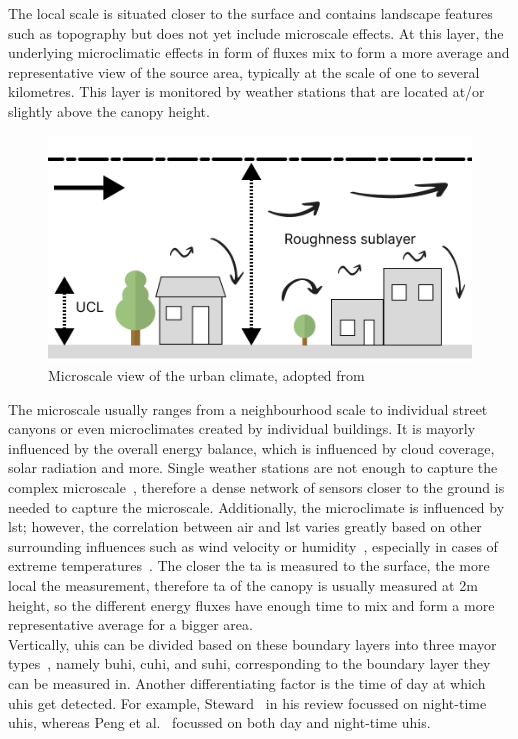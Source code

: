 The local scale is situated closer to the surface and contains landscape features such as topography but does not yet include microscale effects. At this layer, the underlying microclimatic effects in form of fluxes mix to form a more average and representative view of the source area, typically at the scale of one to several kilometres. This layer is monitored by weather stations that are located at/or slightly above the canopy height.

\begin{figure}[h]
    \centering
    \includegraphics[width=\textwidth]{images/microscale boundary layer.png}
    \caption{Microscale view of the urban climate, adopted from~\cite{oke2006guideline}}
    \label{fig:microscale boundary layer}
\end{figure}

The microscale usually ranges from a neighbourhood scale to individual street canyons or even microclimates created by individual buildings. It is mayorly influenced by the overall energy balance, which is influenced by cloud coverage, solar radiation and more. Single weather stations are not enough to capture the complex microscale~\cite{oke2004siting}, therefore a dense network of sensors closer to the ground is needed to capture the microscale. Additionally, the microclimate is influenced by \gls{lst}; however, the correlation between air and \gls{lst} varies greatly based on other surrounding influences such as wind velocity or humidity~\cite{stoll1992surface}, especially in cases of extreme temperatures~\cite{good2016situ}. The closer the \gls{ta} is measured to the surface, the more local the measurement, therefore \gls{ta} of the canopy is usually measured at 2m height, so the different energy fluxes have enough time to mix and form a more representative average for a bigger area.\\
Vertically, \gls{uhi}s can be divided based on these boundary layers into three mayor types~\cite{oke1976distinction, oke2017urban}, namely \gls{buhi}, \gls{cuhi}, and \gls{suhi}, corresponding to the boundary layer they can be measured in. Another differentiating factor is the time of day at which \gls{uhi}s get detected. For example, Steward~\cite{stewart2011systematic} in his review focussed on night-time \gls{uhi}s, whereas Peng et al.~\cite{peng2012surface} focussed on both day and night-time \gls{uhi}s.

